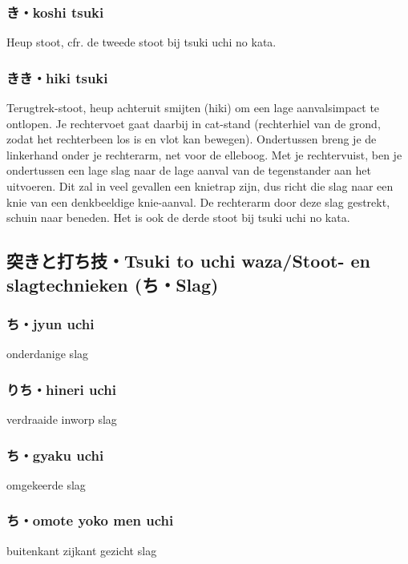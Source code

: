 \subsubsection{き・koshi tsuki}
Heup stoot, cfr. de tweede stoot bij tsuki uchi no kata.

\subsubsection{きき・hiki tsuki}
Terugtrek-stoot, heup achteruit smijten (hiki) om een lage aanvalsimpact te ontlopen. Je rechtervoet gaat daarbij in cat-stand (rechterhiel van de grond, zodat het rechterbeen los is en vlot kan bewegen). Ondertussen breng je de linkerhand onder je rechterarm, net voor de elleboog. Met je rechtervuist, ben je ondertussen een lage slag naar de lage aanval van de tegenstander aan het uitvoeren. Dit zal in veel gevallen een knietrap zijn, dus richt die slag naar een knie van een denkbeeldige knie-aanval. De rechterarm door deze slag gestrekt, schuin naar beneden. Het is ook de derde stoot bij tsuki uchi no kata.

\subsection{突きと打ち技・Tsuki to uchi waza/Stoot- en slagtechnieken ({\bfseries{}ち・Slag})}
\subsubsection{ち・jyun uchi}
onderdanige slag

\subsubsection{りち・hineri uchi}
verdraaide inworp slag

\subsubsection{ち・gyaku uchi}
omgekeerde slag

\subsubsection{ち・omote yoko men uchi}
buitenkant zijkant gezicht slag

